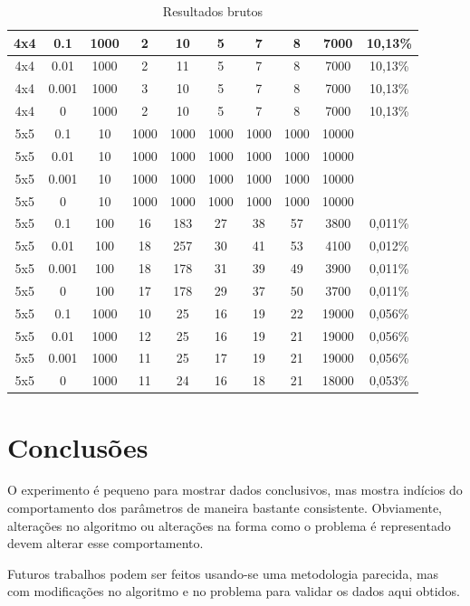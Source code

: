 \documentclass{llncs}
\begin{document}
\begin{table}
\begin{tabular}{|c|S|c|c|c|c|c|c|c|c|}
\hline
4x4 & 0.1 & 1000 & 2 & 10 & 5 & 7 & 8 & 7000 & 10,13\%\\ 
\hline
4x4 & 0.01 & 1000 & 2 & 11 & 5 & 7 & 8 & 7000 & 10,13\%\\ 
\hline
4x4 & 0.001 & 1000 & 3 & 10 & 5 & 7 & 8 & 7000 & 10,13\%\\ 
\hline
4x4 & 0 & 1000 & 2 & 10 & 5 & 7 & 8 & 7000 & 10,13\%\\ 
\hline
5x5 & 0.1 & 10 & 1000 & 1000 & 1000 & 1000 & 1000 & 10000 & \\ 
\hline
5x5 & 0.01 & 10 & 1000 & 1000 & 1000 & 1000 & 1000 & 10000 & \\ 
\hline
5x5 & 0.001 & 10 & 1000 & 1000 & 1000 & 1000 & 1000 & 10000 & \\ 
\hline
5x5 & 0 & 10 & 1000 & 1000 & 1000 & 1000 & 1000 & 10000 & \\ 
\hline
5x5 & 0.1 & 100 & 16 & 183 & 27 & 38 & 57 & 3800 & 0,011\%\\ 
\hline
5x5 & 0.01 & 100 & 18 & 257 & 30 & 41 & 53 & 4100 & 0,012\%\\ 
\hline
5x5 & 0.001 & 100 & 18 & 178 & 31 & 39 & 49 & 3900 & 0,011\%\\ 
\hline
5x5 & 0 & 100 & 17 & 178 & 29 & 37 & 50 & 3700 & 0,011\%\\ 
\hline
5x5 & 0.1 & 1000 & 10 & 25 & 16 & 19 & 22 & 19000 & 0,056\%\\ 
\hline
5x5 & 0.01 & 1000 & 12 & 25 & 16 & 19 & 21 & 19000 & 0,056\%\\ 
\hline
5x5 & 0.001 & 1000 & 11 & 25 & 17 & 19 & 21 & 19000 & 0,056\%\\ 
\hline
5x5 & 0 & 1000 & 11 & 24 & 16 & 18 & 21 & 18000 & 0,053\%\\ 
\hline
\hline\end{tabular}
\label{tab:resultados}
\caption{\small{Resultados brutos}} 
\end{table}

%
\section{Conclusões}
%
O experimento é pequeno para mostrar dados conclusivos, mas mostra indícios do comportamento dos parâmetros de maneira bastante consistente. Obviamente, alterações no algoritmo ou alterações na forma como o problema é representado devem alterar esse comportamento.

Futuros trabalhos podem ser feitos usando-se uma metodologia parecida, mas com modificações no algoritmo e no problema para validar os dados aqui obtidos.
\end{document}
